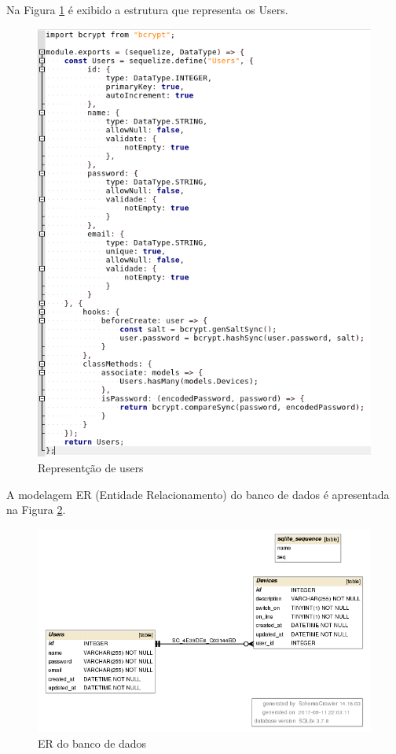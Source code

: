Na Figura \ref{doc-users} é exibido a estrutura que representa os Users.

\begin{figure}[H]
\caption{\label{doc-users} Representção de users}
\includegraphics[scale=0.5]{img/users-doc.png}
\end{figure}

A modelagem ER (Entidade Relacionamento) do banco de dados é apresentada na Figura \ref{er-db}.

\begin{figure}[H]
\caption{\label{er-db} ER do banco de dados}
\includegraphics[scale=0.5]{img/ysto-db.png}
\end{figure}




